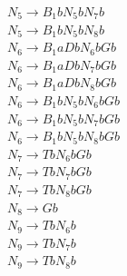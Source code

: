 \documentclass[a4paper,14pt]{extarticle}
\begin{document}
\begin{enumerate}[1.]
$N_5 \rightarrow B_1bN_5bN_7b$\\
$N_5 \rightarrow B_1bN_5bN_8b$\\
$N_6 \rightarrow B_1aDbN_6bGb$\\
$N_6 \rightarrow B_1aDbN_7bGb$\\
$N_6 \rightarrow B_1aDbN_8bGb$\\
$N_6 \rightarrow B_1bN_5bN_6bGb$\\
$N_6 \rightarrow B_1bN_5bN_7bGb$\\
$N_6 \rightarrow B_1bN_5bN_8bGb$\\
$N_7 \rightarrow TbN_6bGb$\\
$N_7 \rightarrow TbN_7bGb$\\
$N_7 \rightarrow TbN_8bGb$\\
$N_8 \rightarrow Gb$\\
$N_9 \rightarrow TbN_6b$\\
$N_9 \rightarrow TbN_7b$\\
$N_9 \rightarrow TbN_8b$\\


\end{enumerate}
\end{document}
